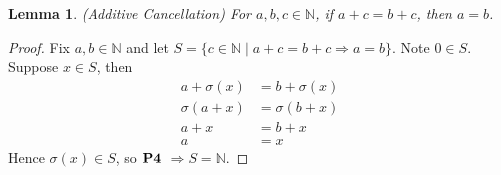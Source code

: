 \documentclass{article}
\newtheorem*{lemma}{Lemma}
\begin{document}
\hfill\break
\begin{lemma}{(Additive Cancellation)}
	For $a,b,c \in \mathbb{N}$, if $a+c=b+c$, then $a=b$.
\end{lemma}
\begin{proof}
	Fix $a,b\in\mathbb{N}$ and let
  	$S=\{c\in\mathbb{N}\mid a+c=b+c\Rightarrow a=b\}$.
  	Note $0\in S$. Suppose $x\in S$, then
  	\begin{align*}
    	a+\sigma(x) &= b+\sigma(x)          \\
    	\sigma(a+x) &= \sigma(b+x) \tag{2}  \\
                a+x &= b+x         \tag{P3} \\
                  a &= x           \tag{IH}
  \end{align*}
  Hence $\sigma(x) \in S$, so $\bf{P4}$
  $\Rightarrow S = \mathbb{N}$.
\end{proof}
\end{document}

